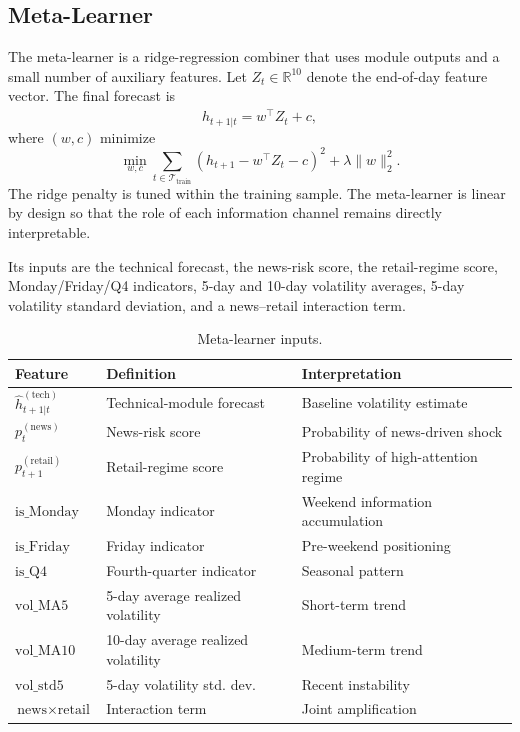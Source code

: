 \documentclass[review]{elsarticle}
\begin{document}
\subsection{Meta-Learner}\label{rive-coordinator}

The meta-learner is a ridge-regression combiner that uses module outputs and a small number of auxiliary features. Let $Z_t \in \mathbb{R}^{10}$ denote the end-of-day feature vector. The final forecast is
\begin{equation}\label{eq:coordinator}
\widehat{h}_{t+1|t} = w^\top Z_t + c,
\end{equation}
where $(w,c)$ minimize
\[
\min_{w,c} \sum_{t \in \mathcal{T}_{\text{train}}} \left(h_{t+1}-w^\top Z_t-c\right)^2 + \lambda \|w\|_2^2.
\]
The ridge penalty is tuned within the training sample. The meta-learner is linear by design so that the role of each information channel remains directly interpretable.

Its inputs are the technical forecast, the news-risk score, the retail-regime score, Monday/Friday/Q4 indicators, 5-day and 10-day volatility averages, 5-day volatility standard deviation, and a news--retail interaction term.

\begin{table}[t]
\centering
\caption{Meta-learner inputs.}
\label{tab:coordinator-features}
\begin{tabular}{lll}
\hline
Feature & Definition & Interpretation \\\hline
$\widehat{h}_{t+1|t}^{(\text{tech})}$ & Technical-module forecast & Baseline volatility estimate \\
$p_t^{(\text{news})}$ & News-risk score & Probability of news-driven shock \\
$p_{t+1}^{(\text{retail})}$ & Retail-regime score & Probability of high-attention regime \\
$\text{is\_Monday}$ & Monday indicator & Weekend information accumulation \\
$\text{is\_Friday}$ & Friday indicator & Pre-weekend positioning \\
$\text{is\_Q4}$ & Fourth-quarter indicator & Seasonal pattern \\
$\text{vol\_MA5}$ & 5-day average realized volatility & Short-term trend \\
$\text{vol\_MA10}$ & 10-day average realized volatility & Medium-term trend \\
$\text{vol\_std5}$ & 5-day volatility std. dev. & Recent instability \\
$\text{news}\times\text{retail}$ & Interaction term & Joint amplification \\\hline
\end{tabular}
\end{table}
\end{document}
